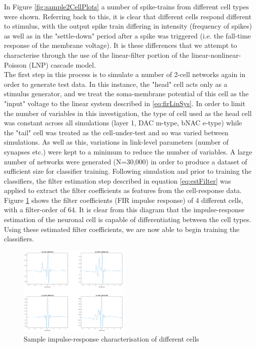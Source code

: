 \documentclass[letterpaper, 10 pt, conference]{ieeeconf}  %
\begin{document}
In Figure \ref{fig:sample2CellPlots} a number of spike-trains from different cell types were shown. Referring back to this, it is clear that different cells respond different to stimulus, with the output spike train differing in intensity (frequency of spikes) as well as in the "settle-down" period after a spike was triggered (i.e. the fall-time response of the membrane voltage). It is these differences that we attempt to characterise through the use of the linear-filter portion of the linear-nonlinear-Poisson (LNP) cascade model.\\
The first step in this process is to simulate a number of 2-cell networks again in order to generate test data. In this instance, the "head" cell acts only as a stimulus generator, and we treat the soma-membrane potential of this cell as the "input" voltage to the linear system described in \ref{eq:firLinSys}. In order to limit the number of variables in this investigation, the type of cell used as the head cell was constant across all simulations (layer 1, DAC m-type, bNAC e-type) while the "tail" cell was treated as the cell-under-test and so was varied between simulations. As well as this, variations in link-level parameters (number of synapses etc.) were kept to a minimum to reduce the number of variables. A large number of networks were generated (N=30,000) in order to produce a dataset of sufficient size for classifier training.
Following simulation and prior to training the classifiers, the filter estimation step described in equation \ref{eq:estFilter} was applied to extract the filter coefficients as features from the cell-response data. Figure \ref{fig:sampImpRes} shows the filter coefficients (FIR impulse response) of 4 different cells, with a filter-order of 64. It is clear from this diagram that the impulse-response estimation of the neuronal cell is capable of differentiating between the cell types. Using these estimated filter coefficients, we are now able to begin training the classifiers.
\begin{figure}[ht]
    \centering
    \includegraphics[width=0.48\textwidth]{sampImpRes.png}
    \caption{Sample impulse-response characterisation of different cells}
    \label{fig:sampImpRes}
\end{figure}
\end{document}
